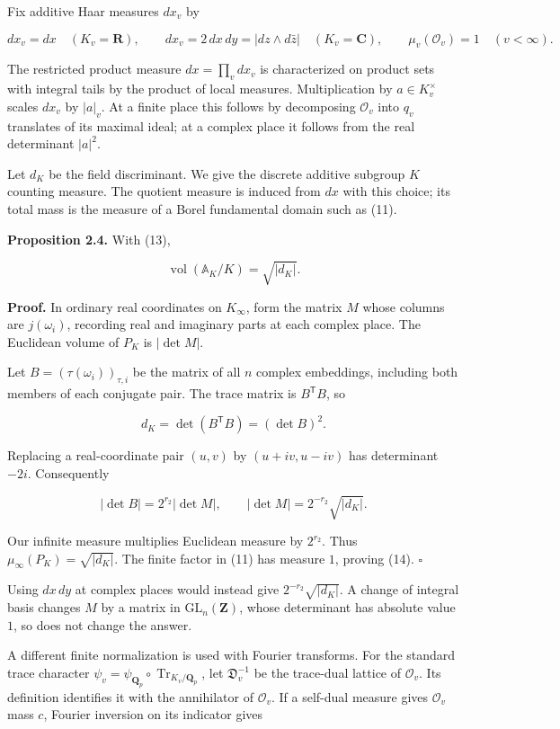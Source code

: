 \documentclass[
  english,
  11pt,
  a4paper,
]{article}
\begin{document}
Fix additive Haar measures \(dx_v\) by

\[dx_v=dx\quad(K_v=\mathbf R),\qquad
dx_v=2\,dx\,dy=|dz\wedge d\bar z|
\quad(K_v=\mathbf C),\qquad
\mu_v(\mathcal O_v)=1\quad(v<\infty).
\tag{13}\]

The restricted product measure \(dx=\prod_v dx_v\) is characterized on
product sets with integral tails by the product of local measures.
Multiplication by \(a\in K_v^\times\) scales \(dx_v\) by \(|a|_v\). At a
finite place this follows by decomposing \(\mathcal O_v\) into \(q_v\)
translates of its maximal ideal; at a complex place it follows from the
real determinant \(|a|^2\).

Let \(d_K\) be the field discriminant. We give the discrete additive
subgroup \(K\) counting measure. The quotient measure is induced from
\(dx\) with this choice; its total mass is the measure of a Borel
fundamental domain such as (11).

\textbf{Proposition 2.4.} With (13),

\[\operatorname{vol}(\mathbb A_K/K)=\sqrt{|d_K|}.
\tag{14}\]

\textbf{Proof.} In ordinary real coordinates on \(K_\infty\), form the
matrix \(M\) whose columns are \(j(\omega_i)\), recording real and
imaginary parts at each complex place. The Euclidean volume of \(P_K\)
is \(|\det M|\).

Let \(B=(\tau(\omega_i))_{\tau,i}\) be the matrix of all \(n\) complex
embeddings, including both members of each conjugate pair. The trace
matrix is \(B^{\mathsf T}B\), so

\[d_K=\det(B^{\mathsf T}B)=(\det B)^2.\]

Replacing a real-coordinate pair \((u,v)\) by \((u+iv,u-iv)\) has
determinant \(-2i\). Consequently

\[|\det B|=2^{r_2}|\det M|,
\qquad
|\det M|=2^{-r_2}\sqrt{|d_K|}.
\tag{15}\]

Our infinite measure multiplies Euclidean measure by \(2^{r_2}\). Thus
\(\mu_\infty(P_K)=\sqrt{|d_K|}\). The finite factor in (11) has measure
\(1\), proving (14). \(\square\)

Using \(dx\,dy\) at complex places would instead give
\(2^{-r_2}\sqrt{|d_K|}\). A change of integral basis changes \(M\) by a
matrix in \(\mathrm{GL}_n(\mathbf Z)\), whose determinant has absolute
value \(1\), so does not change the answer.

A different finite normalization is used with Fourier transforms. For
the standard trace character
\(\psi_v=\psi_{\mathbf Q_p}\circ\operatorname{Tr}_{K_v/\mathbf Q_p}\),
let \(\mathfrak D_v^{-1}\) be the trace-dual lattice of
\(\mathcal O_v\). Its definition identifies it with the annihilator of
\(\mathcal O_v\). If a self-dual measure gives \(\mathcal O_v\) mass
\(c\), Fourier inversion on its indicator gives
\end{document}
